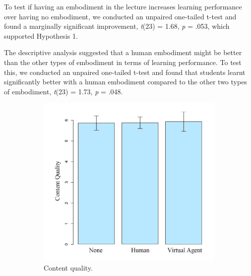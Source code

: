 \documentclass{sigchi}
\begin{document}
To test if having an embodiment in the lecture increases learning performance over having no embodiment, we conducted an unpaired one-tailed t-test and found a marginally significant improvement, \textit{t}(23) = 1.68, \textit{p} = .053, which supported Hypothesis 1.

The descriptive analysis suggested that a human embodiment might be better than the other types of embodiment in terms of learning performance. To test this, we conducted an unpaired one-tailed t-test and found that students learnt significantly better with a human embodiment compared to the other two types of embodiment, \textit{t}(23) = 1.73, \textit{p} = .048. 


\begin{figure}[t]
    \centering
    \begin{subfigure}{0.4\textwidth}
        \centering
        \includegraphics[width=\textwidth]{Figures/Content.jpg}
        \caption{Content quality.}
        \label{fig:Content}
    \end{subfigure}
    \begin{subfigure}{0.4\textwidth}
        \centering

\end{subfigure}
\end{figure}
\end{document}
